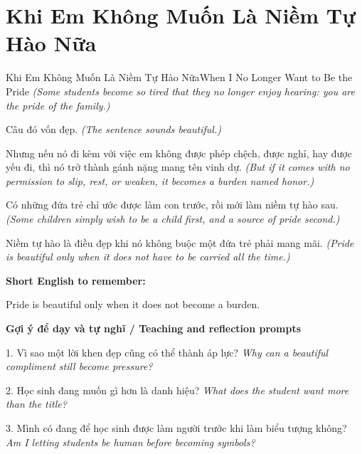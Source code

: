 \section{Khi Em Không Muốn Là Niềm Tự Hào Nữa}
\begin{truyen}{Khi Em Không Muốn Là Niềm Tự Hào Nữa}{When I No Longer Want to Be the Pride}
\textit{(Some students become so tired that they no longer enjoy hearing: you are the pride of the family.)}

Câu đó vốn đẹp.
\textit{(The sentence sounds beautiful.)}

Nhưng nếu nó đi kèm với việc em không được phép chệch, được nghỉ, hay được yếu đi, thì nó trở thành gánh nặng mang tên vinh dự.
\textit{(But if it comes with no permission to slip, rest, or weaken, it becomes a burden named honor.)}

Có những đứa trẻ chỉ ước được làm con trước, rồi mới làm niềm tự hào sau.
\textit{(Some children simply wish to be a child first, and a source of pride second.)}

\end{truyen}

\begin{baihoc}
Niềm tự hào là điều đẹp khi nó không buộc một đứa trẻ phải mang mãi.
\textit{(Pride is beautiful only when it does not have to be carried all the time.)}
\end{baihoc}

\begin{ghinhoanh}
\textbf{Short English to remember:}

Pride is beautiful only when it does not become a burden.

\end{ghinhoanh}

\begin{tuhocnhanh}
\textbf{Gợi ý để dạy và tự nghĩ / Teaching and reflection prompts}

1. Vì sao một lời khen đẹp cũng có thể thành áp lực? \textit{Why can a beautiful compliment still become pressure?}

2. Học sinh đang muốn gì hơn là danh hiệu? \textit{What does the student want more than the title?}

3. Mình có đang để học sinh được làm người trước khi làm biểu tượng không? \textit{Am I letting students be human before becoming symbols?}
\end{tuhocnhanh}
\ngancach

